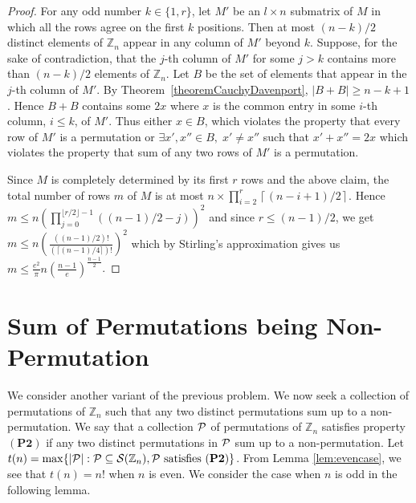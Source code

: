 \documentclass[12pt]{article}
\newcommand{\Zn}{\mathbb{Z}_n}
\newcommand{\mb}{\mathbb}
\newcommand{\PsZn}{{\cal S}(\Zn)}
\begin{document}
\begin{proof}
\medskip
{} For any odd number $k \in \{1, r\}$, let $M'$ be an
$l \times n$ submatrix of $M$ in which all the rows agree on the first $k$
positions. Then at most $(n-k)/2$ distinct elements of $\mb{Z}_n$ appear in
any column of $M'$ beyond $k$. Suppose, for the sake of contradiction, that
the $j$-th column of $M'$ for some $j > k$ contains more than $(n-k)/2$
elements of $\mb{Z}_n$. Let $B$ be the set of elements that appear in the
$j$-th column of $M'$. By Theorem~\ref{theoremCauchyDavenport}, $|B + B|
\geq  n - k + 1$. Hence $B + B$ contains some $2x$ where $x$ is the common
entry in some $i$-th column, $i \leq k$, of $M'$. Thus either $x \in B$,
which violates the property that every row  of $M'$ is a permutation or 
$\exists x', x'' \in B, \; x' \neq x''$ such that $x' + x'' = 2x$ which 
violates the property that sum of any two rows of $M'$ is a permutation.

Since $M$ is completely determined by its first $r$ rows and the above claim, the total number of rows $m$ of $M$ is at most $n \times \prod_{i=2}^{r}\left\lceil(n - i + 1)/2\right\rceil$. Hence $m \leq n \left( \prod_{j=0}^{\lfloor r/2 \rfloor -1}\left((n-1)/2 - j \right) \right)^2$ and since $r \leq (n-1)/2$, we get   $m \leq n \left( \frac{((n-1)/2)!}{(\lceil (n-1)/4 \rceil)!} \right)^2$ which by Stirling's approximation gives us $m \leq \frac{e^2}{\pi} n \left(\frac{n-1}{e}\right)^\frac{n-1}{2}$.
\end{proof}


\section{Sum of Permutations being Non-Permutation}\label{sec:nonperm}
We consider another variant of the previous problem. We now seek a
collection of permutations of $\Zn$ such that any two distinct permutations
sum up to a non-permutation. We say that a collection ${\cal P}$ of
permutations of $\Zn$ satisfies property $\mathbf{(P2)}$ if any two
distinct permutations in ${\cal P}$ sum up to a non-permutation. Let
$t(n)=\max\{|{\cal P}|: {\cal P}\subseteq \PsZn, {\cal P} \text{ satisfies
} \mathbf{(P2)}\}$. From Lemma \ref{lem:evencase}, we see that $t(n)=n!$
when $n$ is even. We consider the case when $n$ is odd in the following
lemma.
\end{document}
